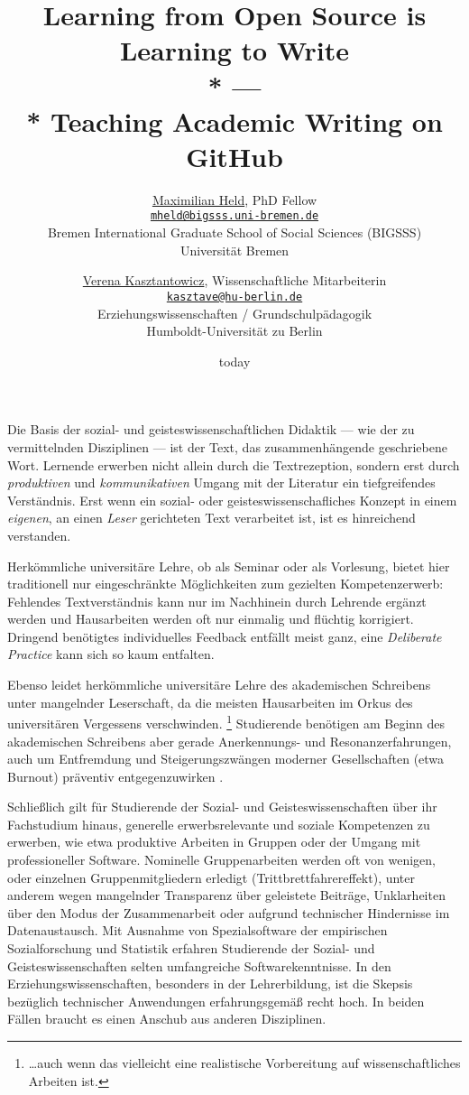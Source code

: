 \documentclass
	[
		11pt,
		a4paper,
		oneside,
		ngerman
	]
	{article}
\title{
	Learning from Open Source is Learning to Write\\*
	---\\*
	Teaching Academic Writing on GitHub
}
\date{today}
\author{
	\href{http://www.maxheld.de}{Maximilian Held}, PhD Fellow\\
	\href{mailto:mheld@bigsss.uni-bremen.de}{\texttt{mheld@bigsss.uni-bremen.de}}\\
	Bremen International Graduate School of Social Sciences (BIGSSS)\\
	Universität Bremen
	\and
	\href{https://www.erziehungswissenschaften.hu-berlin.de/grundschulpaed/mitarbeiterinnen/lb-deutsch/v.-kasztantowicz}{Verena Kasztantowicz}, Wissenschaftliche Mitarbeiterin\\
	\href{mailto:kasztave@hu-berlin.de}{\texttt{kasztave@hu-berlin.de}}\\
	Erziehungswissenschaften / Grundschulpädagogik \\
	Humboldt-Universität zu Berlin
}
\begin{document}
\maketitle

\begin{abstract}
	\immediate{}%
	
\end{abstract}

Die Basis der sozial- und geisteswissenschaftlichen Didaktik --- wie der zu vermittelnden Disziplinen --- ist der Text, das zusammenhängende geschriebene Wort.
Lernende erwerben nicht allein durch die Textrezeption, sondern erst durch \emph{produktiven} und \emph{kommunikativen} Umgang mit der Literatur ein tiefgreifendes Verständnis.
Erst wenn ein sozial- oder geisteswissenschafliches Konzept in einem \emph{eigenen}, an einen \emph{Leser} gerichteten Text verarbeitet ist, ist es hinreichend verstanden.

Herkömmliche universitäre Lehre, ob als Seminar oder als Vorlesung, bietet hier traditionell nur eingeschränkte Möglichkeiten zum gezielten Kompetenzerwerb: Fehlendes Textverständnis kann nur im Nachhinein durch Lehrende ergänzt werden und Hausarbeiten werden oft nur einmalig und flüchtig korrigiert.
Dringend benötigtes individuelles Feedback entfällt meist ganz, eine \emph{Deliberate Practice} \parencite{Ericsson2007} kann sich so kaum entfalten.

Ebenso leidet herkömmliche universitäre Lehre des akademischen Schreibens unter mangelnder Leserschaft, da die meisten Hausarbeiten im Orkus des universitären Vergessens verschwinden.
\footnote{
	\ldots auch wenn das vielleicht eine realistische Vorbereitung auf wissenschaftliches Arbeiten ist.
}
Studierende benötigen am Beginn des akademischen Schreibens aber gerade Anerkennungs- und Resonanzerfahrungen, auch um Entfremdung und Steigerungszwängen moderner Gesell\-schaften (etwa Burnout) präventiv entgegenzuwirken \parencite{Rosa-Paech-etal-2014}.

Schließlich gilt für Studierende der Sozial- und Geisteswissenschaften über ihr Fachstudium hinaus, generelle erwerbsrelevante und soziale Kompetenzen zu erwerben, wie etwa produktive Arbeiten in Gruppen oder der Umgang mit professioneller Software.
Nominelle Gruppenarbeiten werden oft von wenigen, oder einzelnen Gruppenmitgliedern erledigt (Trittbrettfahrereffekt), unter anderem wegen mangelnder Transparenz über geleistete Beiträge, Unklarheiten über den Modus der Zusammenarbeit oder aufgrund technischer Hindernisse im Datenaustausch.
Mit Ausnahme von Spezialsoftware der empirischen Sozialforschung und Statistik erfahren Studierende der Sozial- und Geisteswissenschaften selten umfangreiche Softwarekenntnisse.
In den Erziehungswissenschaften, besonders in der Lehrerbildung, ist die Skepsis bezüglich technischer Anwendungen erfahrungsgemäß recht hoch.
In beiden Fällen braucht es einen Anschub aus anderen Disziplinen.
\end{document}
